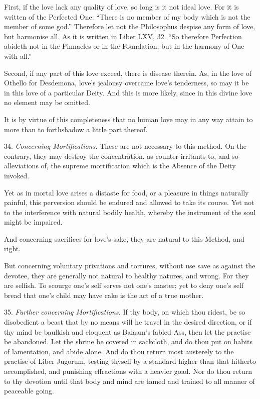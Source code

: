 First, if the love lack any quality of love, so long is it not ideal love. For it is written of the Perfected One: \enquote{There is no member of my body which is not the member of some god.} Therefore let not the Philosophus despise any form of love, but harmonise all. As it is written in Liber LXV, 32. \enquote{So therefore Perfection abideth not in the Pinnacles or in the Foundation, but in the harmony of One with all.}

Second, if any part of this love exceed, there is disease therein. As, in the love of Othello for Desdemona, love's jealousy overcame love's tenderness, so may it be in this love of a particular Deity. And this is more likely, since in this divine love no element may be omitted.

It is by virtue of this completeness that no human love may in any way attain to more than to forthshadow a little part thereof.

34. \textit{Concerning Mortifications.} These are not necessary to this method. On the contrary, they may destroy the concentration, as counter-irritants to, and so alleviations of, the supreme mortification which is the Absence of the Deity invoked.

Yet as in mortal love arises a distaste for food, or a pleasure in things naturally painful, this perversion should be endured and allowed to take its course. Yet not to the interference with natural bodily health, whereby the instrument of the soul might be impaired.

And concerning sacrifices for love's sake, they are natural to this Method, and right.

But concerning voluntary privations and tortures, without use save as against the devotee, they are generally not natural to healthy natures, and wrong. For they are selfish. To scourge one's self serves not one's master; yet to deny one's self bread that one's child may have cake is the act of a true mother.

35. \textit{Further concerning Mortifications.} If thy body, on which thou ridest, be so disobedient a beast that by no means will he travel in the desired direction, or if thy mind be baulkish and eloquent as Balaam's fabled Ass, then let the practise be abandoned. Let the shrine be covered in sackcloth, and do thou put on habits of lamentation, and abide alone. And do thou return most austerely to the practise of Liber Jugorum, testing thyself by a standard higher than that hitherto accomplished, and punishing effractions with a heavier goad. Nor do thou return to thy devotion until that body and mind are tamed and trained to all manner of peaceable going.


